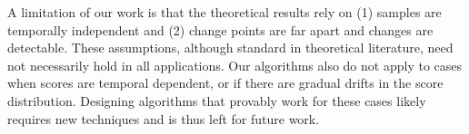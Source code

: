 A limitation of our work is that the theoretical results rely on (1) samples are temporally independent and (2) change points are far apart and changes are detectable. These assumptions, although standard in theoretical literature, need not necessarily hold in all applications.
Our algorithms also do not apply to cases when scores are temporal dependent, or if there are gradual drifts in the score distribution. Designing algorithms that provably work for these cases likely requires new techniques and is thus left for future work.








